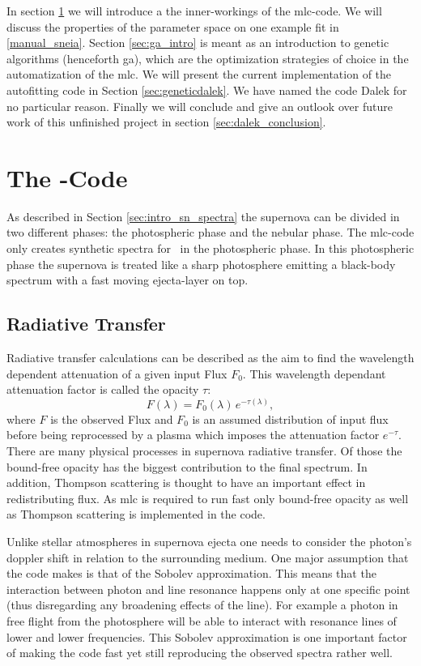 In section \ref{sec:mlc_intro} we will introduce a the inner-workings of the \gls{mlc}-code.  We will discuss the properties of the parameter space on one example fit in \ref{manual_sneia}. Section \ref{sec:ga_intro} is meant as an introduction to genetic algorithms (henceforth \gls{ga}), which are the optimization strategies of choice in the automatization of the \gls{mlc}.  We will present the current implementation of the autofitting code in Section \ref{sec:geneticdalek}. We have named the code Dalek for no particular reason. Finally we will conclude and give an outlook over future work of this unfinished project in section \ref{sec:dalek_conclusion}.

\section{The -Code}
\label{sec:mlc_intro}
As described in Section \ref{sec:intro_sn_spectra} the supernova can be divided in two different phases: the photospheric phase and the nebular phase. The \gls{mlc}-code only creates synthetic spectra for \snia\ in the photospheric phase.
In this photospheric phase the supernova is treated like a sharp photosphere emitting a black-body spectrum with a fast moving ejecta-layer on top.

\subsection{Radiative Transfer}
Radiative transfer calculations can be described as the aim to find the wavelength dependent attenuation of a given input Flux $F_0$. This wavelength dependant attenuation factor is called the opacity $\tau$:
\[
	F(\lambda) = F_0(\lambda)\,e^{-\tau(\lambda)},
\]
where $F$ is the observed Flux and $F_0$ is an assumed distribution of input flux before being reprocessed by a plasma which imposes the attenuation factor $e^{-\tau}$.
There are many physical processes in supernova radiative transfer. Of those the bound-free opacity has the biggest contribution to the final spectrum. In addition, Thompson scattering is thought to have an important effect in redistributing flux. As \gls{mlc} is required to run fast only bound-free opacity as well as Thompson scattering is implemented in the code.

Unlike stellar atmospheres in supernova ejecta one needs to consider the photon's doppler shift in relation to the surrounding medium. One major assumption that the code makes is that of the Sobolev approximation.  This means that the interaction between photon and line resonance happens only at one specific point (thus disregarding any broadening effects of the line). For example a photon in free flight from the photosphere will be able to interact with resonance lines of lower and lower frequencies. This Sobolev approximation is one important factor of making the code fast yet still reproducing the observed spectra rather well.

